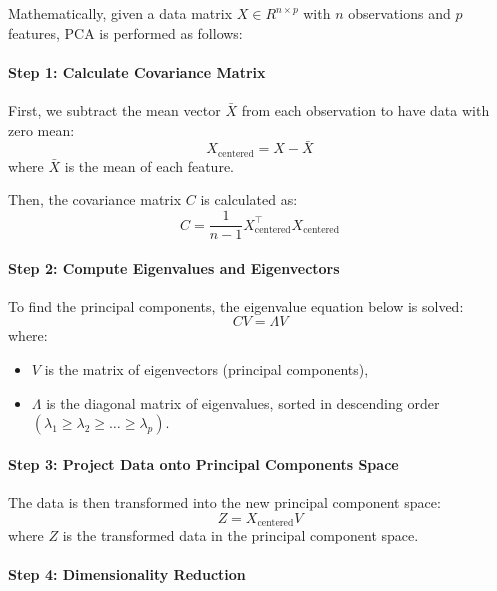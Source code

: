 {{Mathematically, given a data matrix \( X \in {R}^{n \times p} \) with \( n \) observations and \( p \) features, \gls{PCA} is performed as follows:

\paragraph{Step 1: Calculate Covariance Matrix}
First, we subtract the mean vector \( \bar{X} \) from each observation to have data with zero mean:
\begin{equation}
	X_{\text{centered}} = X - \bar{X}
	\label{eq:centering}
\end{equation}
where \( \bar{X} \) is the mean of each feature.

Then, the covariance matrix \( C \) is calculated as:
\begin{equation}
	C = \frac{1}{n-1} X_{\text{centered}}^\top X_{\text{centered}}
	\label{eq:covariance}
\end{equation}

\paragraph{Step 2: Compute Eigenvalues and Eigenvectors}
To find the principal components, the eigenvalue equation below is solved:
\begin{equation}
	C V = \Lambda V
	\label{eq:eigendecomposition}
\end{equation}
where:
\begin{itemize}
	\item \( V \) is the matrix of eigenvectors (principal components),
	\item \( \Lambda \) is the diagonal matrix of eigenvalues, sorted in descending order \( (\lambda_1 \geq \lambda_2 \geq \dots \geq \lambda_p) \).
\end{itemize}

\paragraph{Step 3: Project Data onto Principal Components Space}
The data is then transformed into the new principal component space:
\begin{equation}
	Z = X_{\text{centered}} V
	\label{eq:projection}
\end{equation}
where \( Z \) is the transformed data in the principal component space.

\paragraph{Step 4: Dimensionality Reduction}


}}
